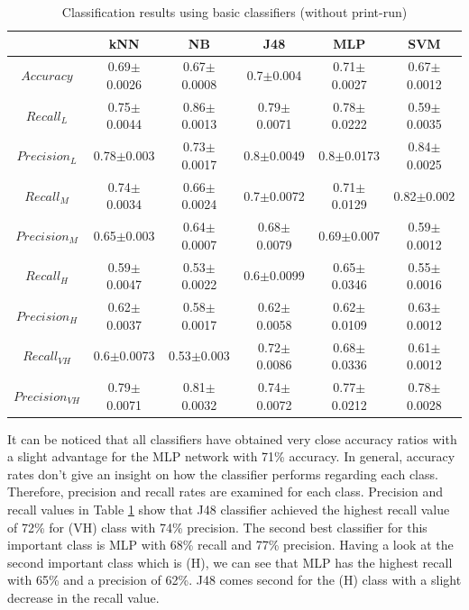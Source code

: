 \documentclass[a4paper,10pt,onecolumn,preprint,3p]{elsarticle}
\begin{document}
\begin{table}
\caption{Classification results using basic classifiers (without print-run)}
\centering{}%
\begin{tabular}{|c|c|c|c|c|c|}
\hline 
 & kNN  & NB  & J48  & MLP  & SVM\tabularnewline
\hline 
\hline 
$Accuracy$  & 0.69$\pm$0.0026 & 0.67$\pm$0.0008 & 0.7$\pm$0.004 & 0.71$\pm$0.0027 & 0.67$\pm$0.0012\tabularnewline
\hline 
\hline 
$Recall_{L}$  & 0.75$\pm$0.0044 & 0.86$\pm$0.0013 & 0.79$\pm$0.0071 & 0.78$\pm$0.0222 & 0.59$\pm$0.0035\tabularnewline
\hline 
$Precision_{L}$  & 0.78$\pm$0.003 & 0.73$\pm$0.0017 & 0.8$\pm$0.0049 & 0.8$\pm$0.0173 & 0.84$\pm$0.0025\tabularnewline
\hline 
\hline 
$Recall_{M}$  & 0.74$\pm$0.0034 & 0.66$\pm$0.0024 & 0.7$\pm$0.0072 & 0.71$\pm$0.0129 & 0.82$\pm$0.002\tabularnewline
\hline 
$Precision_{M}$  & 0.65$\pm$0.003 & 0.64$\pm$0.0007 & 0.68$\pm$0.0079 & 0.69$\pm$0.007 & 0.59$\pm$0.0012\tabularnewline
\hline 
\hline 
$Recall_{H}$  & 0.59$\pm$0.0047 & 0.53$\pm$0.0022 & 0.6$\pm$0.0099 & 0.65$\pm$0.0346 & 0.55$\pm$0.0016\tabularnewline
\hline 
$Precision_{H}$  & 0.62$\pm$0.0037 & 0.58$\pm$0.0017 & 0.62$\pm$0.0058 & 0.62$\pm$0.0109 & 0.63$\pm$0.0012\tabularnewline
\hline 
\hline 
$Recall_{VH}$  & 0.6$\pm$0.0073 & 0.53$\pm$0.003 & 0.72$\pm$0.0086 & 0.68$\pm$0.0336 & 0.61$\pm$0.0012\tabularnewline
\hline 
$Precision_{VH}$  & 0.79$\pm$0.0071 & 0.81$\pm$0.0032 & 0.74$\pm$0.0072 & 0.77$\pm$0.0212 & 0.78$\pm$0.0028\tabularnewline
\hline 
\end{tabular}
\label{table:basic_classifiers}
\end{table}

It can be noticed that all classifiers have obtained very close accuracy ratios with a slight advantage for the MLP network with 71\% accuracy. In general, accuracy rates don't give an insight on how the classifier performs regarding each class. Therefore, precision and recall rates are examined for each class. Precision and recall values in Table \ref{table:basic_classifiers} show that J48 classifier achieved the highest recall value of 72\% for (VH) class with 74\% precision. The second best classifier for this important class is MLP with 68\% recall and 77\% precision. Having a look at the second important class which is (H), we can see that MLP has the highest recall with 65\% and a precision of 62\%. J48 comes second for the (H) class with a slight decrease in the recall value.
\end{document}
